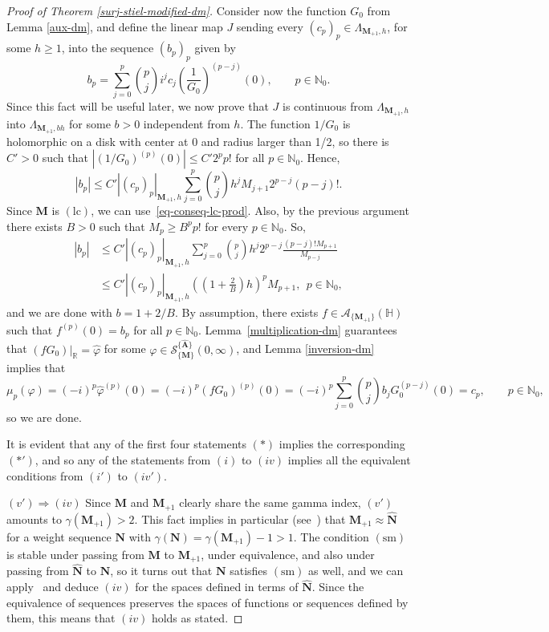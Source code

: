 \documentclass[12pt,a4paper]{article}
\newcommand{\N}{\mathbb{N}}
\newcommand{\R}{\mathbb{R}}
\newcommand{\HH}{\mathbb{H}}
\newcommand{\M}{{\boldsymbol{M}}}
\newcommand{\NN}{{\boldsymbol{N}}}
\newcommand{\hNN}{\widehat{{\boldsymbol{N}}}}
\newcommand{\hA}{\widehat{{\boldsymbol{A}}}}
\newcommand{\lc}{\operatorname{(lc)}}
\newcommand{\sm}{\operatorname{(sm)}}
\newcommand{\ga}{\gamma}
\theoremstyle{plain}
\theoremstyle{definition}
\numberwithin{equation}{section}
\begin{document}
\begin{proof}[Proof of Theorem \ref{surj-stiel-modified-dm}]
\noindent Consider now the function $G_0$ from Lemma \ref{aux-dm}, and define the linear map $J$ sending every $(c_p)_{p} \in \Lambda_{\M_{+1},h}$, for some $h\ge 1$, into the sequence $(b_p)_p$ given by
$$
b_p = \sum_{j = 0}^p \binom{p}{j} i^jc_j \left ( \frac{1}{G_0} \right)^{(p-j)} (0), \qquad p \in \N_0.
$$
Since this fact will be useful later, we now prove that $J$ is continuous from $\Lambda_{\M_{+1},h}$ into $\Lambda_{\M_{+1},bh}$ for some $b>0$ independent from $h$.
The function $1/G_0$ is holomorphic on a disk with center at 0 and radius larger than 1/2, so there is $C' > 0$ such that $ |(1/G_0)^{(p)}(0)| \leq C' 2^p p!$ for all $p \in \N_0$. Hence,
$$
|b_p| \le  C'|(c_p)_p|_{\M_{+1},h}\sum_{j = 0}^p \binom{p}{j} h^j M_{j+1} 2^{p-j} (p-j)!.
$$
Since $\M$ is $\lc$, we can use~\eqref{eq-conseq-lc-prod}. Also, by the previous argument there exists $B>0$ such that $M_p\ge B^pp!$ for every $p\in\N_0$. So,
\begin{align*}
|b_p| &\le C'|(c_p)_p|_{\M_{+1},h}\sum_{j = 0}^p \binom{p}{j} h^j 2^{p-j} \frac{(p-j)!M_{p+1}}{M_{p-j}}\\
&\le C'|(c_p)_p|_{\M_{+1},h} \left(\left(1+\frac{2}{B}\right)h\right)^pM_{p+1},\ \ p\in\N_0,
\end{align*}
and we are done with $b=1+2/B$.
By assumption, there exists $f\in\mathcal{A}_{\{\M_{+1}\}}(\HH)$ such that $f^{(p)}(0) = b_p$ for all $p \in \N_0$. Lemma~\ref{multiplication-dm} guarantees that $(fG_0)|_{\R} = \widehat{\varphi}$ for some $\varphi \in \mathcal{S}^{\{\hA\}}_{\{\M\}}(0,\infty)$, and Lemma \ref{inversion-dm} implies that
$$
\mu_p(\varphi) = (-i)^p \widehat{\varphi}^{(p)}(0) = (-i)^p(fG_0)^{(p)}(0) = (-i)^p\sum_{j=0}^p \binom{p}{j} b_j G_0^{(p-j)}(0) = c_p, \qquad p \in \N_0,
$$
so we are done.

It is evident that any of the first four statements $(*)$ implies the corresponding $(*')$, and so any of the statements from $(i)$ to $(iv)$ implies all the equivalent conditions from $(i')$ to $(iv')$.

$(v')\Rightarrow(iv)$ Since $\M$ and $\M_{+1}$ clearly share the same gamma index, $(v')$ amounts to $\ga(\M_{+1})>2$. This fact implies in particular (see~\cite[Corollary 3.12 and Remark 3.15]{JimenezSanzSchindlIndex}) that $\M_{+1}\approx\hNN$ for a weight sequence $\NN$ with $\ga(\NN)=\ga(\M_{+1})-1>1$. The condition $\sm$ is stable under passing from $\M$ to $\M_{+1}$, under equivalence, and also under passing from $\hNN$ to $\NN$, so it turns out that $\NN$ satisfies $\sm$ as well, and we can apply~\cite[Theorem 3.3]{JimenezMiguelSanzSchindlSurjectSM} and deduce $(iv)$ for the spaces defined in terms of $\hNN$. Since the equivalence of sequences preserves the spaces of functions or sequences defined by them, this means that $(iv)$ holds as stated.


\end{proof}
\end{document}
